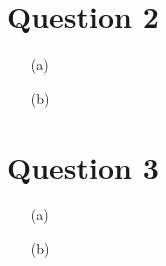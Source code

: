 \documentclass[10pt,a4paper]{article}
\begin{document}
\section*{Question 2}

\begin{itemize}
	\item[(a)]
	\item[(b)]
\end{itemize}

\section*{Question 3}

\begin{itemize}
	\item[(a)]
	\item[(b)]
\end{itemize}
\end{document}
